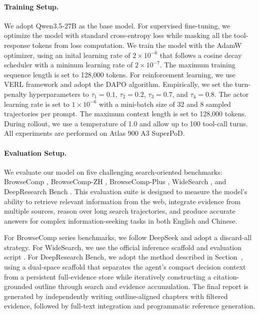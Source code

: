 \documentclass{huawei}
\begin{document}
\paragraph{Training Setup.}
We adopt Qwen3.5-27B as the base model. 
For supervised fine-tuning, we optimize the model with standard cross-entropy loss while masking all the tool-response tokens from loss computation. We train the model with the AdamW optimizer, using an inital learning rate of $2 \times 10^{-6}$ that follows a cosine decay scheduler with a mininum learning rate of $2 \times 10^{-7}$. The maximum training sequence length is set to 128,000 tokens.
For reinforcement learning, we use VERL framework and adopt the DAPO algorithm. Empirically, we set the turn-penalty hyperparameters to $\tau_1=0.1$, $\tau_2=0.2$, $\tau_3=0.7$, and $\tau_4=0.8$. The actor learning rate is set to $1 \times 10^{-6}$ with a mini-batch size of 32 and 8 sampled trajectories per prompt. The maximum context length is set to 128,000 tokens. During rollout, we use a temperature of 1.0 and allow up to 100 tool-call turns.
All experiments are performed on Atlas 900 A3 SuperPoD.

\paragraph{Evaluation Setup.}
We evaluate our model on five challenging search-oriented benchmarks: BrowseComp \cite{wei2025browsecomp}, BrowseComp-ZH \cite{zhou2025browsecomp}, BrowseComp-Plus \cite{chen2025browsecomp}, WideSearch \cite{wong2025widesearch}, and DeepResearch Bench \cite{du2025deepresearch}. 
This evaluation suite is designed to measure the model’s ability to retrieve relevant information from the web, integrate evidence from multiple sources, reason over long search trajectories, and produce accurate answers for complex information-seeking tasks in both English and Chinese.

For BrowseComp series benchmarks, we follow DeepSeek \cite{guo2025deepseek} and adopt a discard-all strategy.
For WideSearch, we use the official inference scaffold and evaluation script \cite{wong2025widesearch}.
For DeepResearch Bench, we adopt the method described in Section~, using a dual-space scaffold that separates the agent’s compact decision context from a persistent full-evidence store while iteratively constructing a citation-grounded outline through search and evidence accumulation. The final report is generated by independently writing outline-aligned chapters with filtered evidence, followed by full-text integration and programmatic reference generation.
\end{document}

